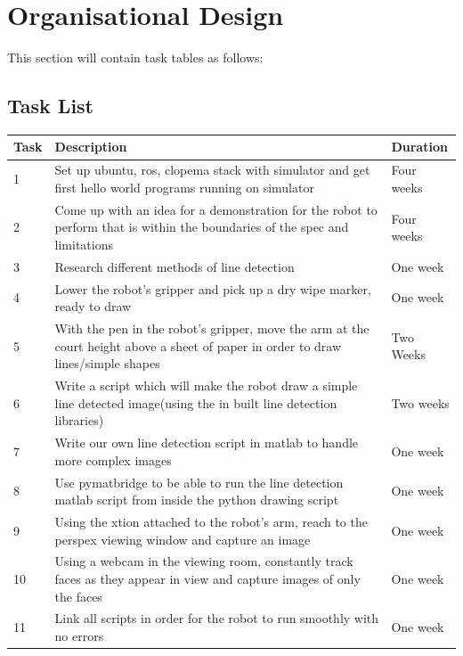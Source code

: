 \documentclass{l3proj}
\begin{document}
\section{Organisational Design}
This section will contain task tables as follows:
\vspace{2mm}

\subsection{Task List}


\begin{tabular}{|p{1cm} | p{11cm} | p{2cm} |} %
\hline
Task & Description & Duration\\
\hline

1 & Set up ubuntu, \acrshort{ros}, \acrshort{clopema} stack with simulator and get first hello world programs running on simulator & Four weeks\\
\hline

2 &  Come up with an idea for a demonstration for the robot to perform that is within the boundaries of the spec and limitations
& Four weeks\\
\hline

3 & Research different methods of line detection 
& One week\\
\hline

4 & Lower the robot's gripper and pick up a dry wipe marker, ready to draw
& One week\\
\hline

5 & With the pen in the robot's gripper, move the arm at the court height above a sheet of paper in order to draw lines/simple shapes
& Two Weeks\\
\hline

6 & Write a script which will make the robot draw a simple line detected image(using the in built line detection libraries)
& Two weeks\\
\hline

7 & Write our own line detection script in matlab to handle more complex images
& One week\\
\hline

8 & Use pymatbridge to be able to run the line detection matlab script from inside the python drawing script
& One week\\
\hline

9 & Using the \gls{xtion} attached to the robot's arm, reach to the perspex viewing window and capture an image
& One week\\
\hline

10 & Using a webcam in the viewing room, constantly track faces as they appear in view and capture images of only the faces
& One week \\
\hline

11 & Link all scripts in order for the robot to run smoothly with no errors 
& One week\\
\hline
\end{tabular}\\
\end{document}
